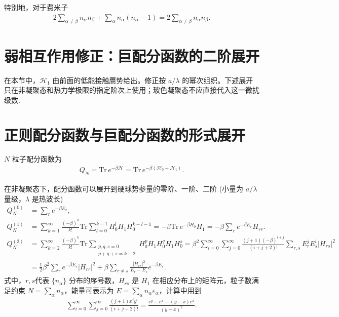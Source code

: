 特别地，对于费米子
\begin{align*}
	2 \sum_{\alpha \neq \beta} n_{\alpha} n_{\beta} + \sum_{\alpha} n_{\alpha} (n_{\alpha} - 1) = 2 \sum_{\alpha \neq \beta} n_{\alpha} n_{\beta}.
\end{align*}

\section{弱相互作用修正：巨配分函数的二阶展开}

在本节中，\(\mathcal{H}_{1}\) 由前面的低能接触赝势给出。修正按 \(a/\lambda\) 的幂次组织。下述展开只在非凝聚态和热力学极限的指定阶次上使用；玻色凝聚态不应直接代入这一微扰级数.

\section{正则配分函数与巨配分函数的形式展开}

\(N\) 粒子配分函数为
\begin{align*}
	Q_{N} = \mathrm{Tr} \, e^{-\beta \mathcal{H}} = \mathrm{Tr} \, e^{-\beta (\mathcal{H}_{0} + \mathcal{H}_{1})}.
\end{align*}

在非凝聚态下，配分函数可以展开到硬球势参量的零阶、一阶、二阶 (小量为 \(a/\lambda\) 量级，\(\lambda\) 是热波长)
\begin{align*}
	Q_{N}^{(0)} &= \sum_{r} e^{-\beta E_{r}}, \\
	Q_{N}^{(1)} &= \sum_{k=1}^{\infty} \frac{(-\beta)^{k}}{k!} \mathrm{Tr} \sum_{l=0}^{k-1} H_{0}^{l} H_{1} H_{0}^{k-l-1} = -\beta \mathrm{Tr} \, e^{-\beta H_{0}} H_{1} = -\beta \sum_{r} e^{-\beta E_{r}} H_{rr}. \\
	Q_{N}^{(2)} &= \sum_{k=2}^{\infty} \frac{(-\beta)^{k}}{k!} \mathrm{Tr} \sum_{\substack{p,q,s=0 \\ p+q+s=k-2}} H_{0}^{p} H_{1} H_{0}^{q} H_{1} H_{0}^{s} = \beta^{2} \sum_{i=0}^{\infty} \sum_{j=0}^{\infty} \frac{(j+1)(-\beta)^{i+j}}{(i+j+2)!} \sum_{r,s} E_{r}^{j} E_{s}^{i} |H_{rs}|^{2} \\
	&= \frac{1}{2} \beta^{2} \sum_{r} e^{-\beta E_{r}} |H_{rr}|^{2} + \beta \sum_{r \neq s} \frac{|H_{rs}|^{2}}{E_{r} - E_{s}} e^{-\beta E_{s}}.
\end{align*}
式中，\(r, s\)代表 \(\{n_{\alpha}\}\) 分布的序号数，\(H_{rs}\) 是 \(H_{1}\) 在相应分布上的矩阵元，粒子数满足约束 \(N = \sum_{\alpha} n_{\alpha}\)，能量可表示为 \(E = \sum_{\alpha} n_{\alpha} \varepsilon_{\alpha}\)，计算中用到
\begin{align*}
	\sum_{i=0}^{\infty} \sum_{j=0}^{\infty} \frac{(j+1) x^{j} y^{i}}{(i+j+2)!} = \frac{e^{y} - e^{x} - (y-x)e^{x}}{(y-x)^{2}}.
\end{align*}

